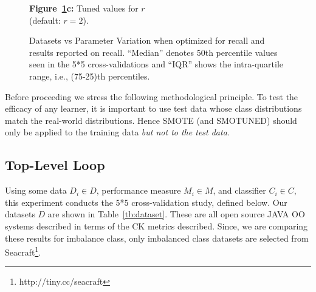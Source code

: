 \documentclass[sigconf,review, anonymous]{acmart}
\theoremstyle{break}
\theoremstyle{break}
\newcommand{\sma}{{\sc SMOTE}}
\newcommand{\smb}{{\sc SMOTUNED}}
\begin{document}
\begin{figure}[!b]
\begin{minipage}{.33\textwidth}
        {\bf Figure~\ref{fig:para}c:} Tuned values for $r$\\ (default:  $r=2$).
    \end{minipage}
    \vspace{-0.2cm}
    \caption{Datasets vs Parameter Variation when optimized for recall and results reported on recall.
    ``Median'' denotes 50th percentile values seen in the 5*5 cross-validations and ``IQR'' shows the intra-quartile
    range, i.e., (75-25)th percentiles.}
    \label{fig:para}
\end{figure}


Before proceeding 
we   stress the following methodological
principle.
To test the efficacy of any learner, it is important to
use test data whose class distributions match the real-world distributions.
Hence {\sma} (and {\smb}) should only
be applied to the training data {\em but
not to the test data}.



\subsection{Top-Level Loop}


Using some data $D_i \in D$, performance measure $M_i \in M$, and classifier $C_i \in C$,
this experiment conducts the 5*5 cross-validation study, defined below.
Our datasets  $D$ are shown in  Table~\ref{tb:dataset}. These are all open source
JAVA OO systems described in terms of the CK metrics described. 
Since, we are comparing these results for imbalance class, only imbalanced class datasets are selected from Seacraft\footnote{http://tiny.cc/seacraft}.
\end{document}
